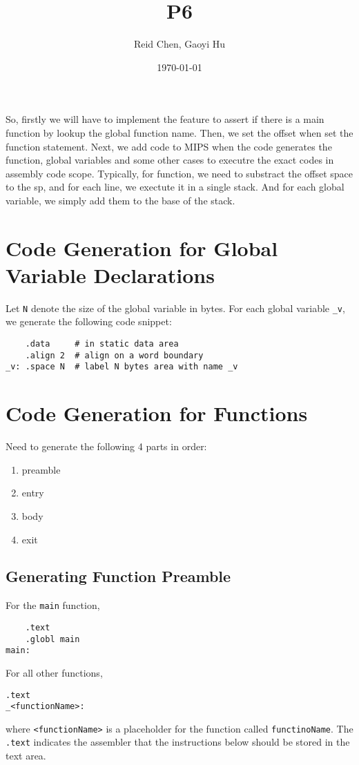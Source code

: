 \documentclass[11pt]{article}
\author{Reid Chen, Gaoyi Hu}
\date{\today}
\title{P6}
\begin{document}
\maketitle
\tableofcontents

So, firstly we will have to implement the feature to assert if there is a main function by lookup the global function name.
Then, we set the offset when set the function statement. Next, we add code to MIPS when the code generates the function, global variables and some other cases to executre the exact codes in assembly code scope. 
Typically, for function, we need to substract the offset space to the sp, and for each line, we exectute it in a single stack. 
And for each global variable, we simply add them to the base of the stack. 
\section{Code Generation for Global Variable Declarations}
\label{sec:org876c3f2}
Let \texttt{N} denote the size of the global variable in bytes. For each global variable \texttt{\_v}, we
generate the following code snippet:
\begin{verbatim}
    .data     # in static data area
    .align 2  # align on a word boundary
_v: .space N  # label N bytes area with name _v
\end{verbatim}
\section{Code Generation for Functions}
\label{sec:orgd4d74ae}
Need to generate the following 4 parts in order:
\begin{enumerate}
\item preamble
\item entry
\item body
\item exit
\end{enumerate}
\subsection{Generating Function Preamble}
\label{sec:org2d38076}
For the \texttt{main} function,
\begin{verbatim}
    .text
    .globl main
main:
\end{verbatim}
For all other functions,
\begin{verbatim}
.text
_<functionName>:
\end{verbatim}
where \texttt{<functionName>} is a placeholder for the function called \texttt{functinoName}.
The \texttt{.text} indicates the assembler that the instructions below should be stored in the text area.
\end{document}
